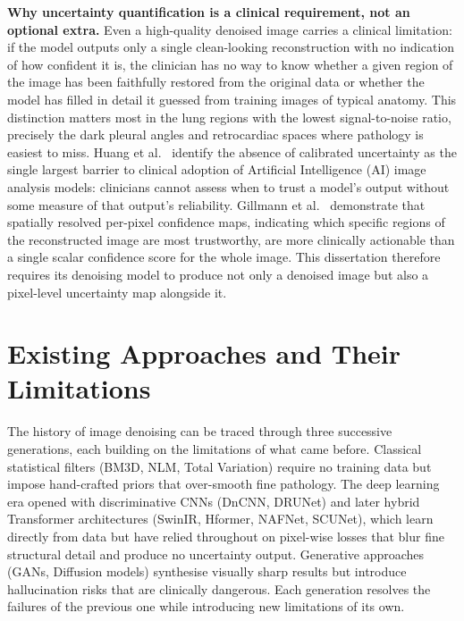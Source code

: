 \documentclass[12pt, a4paper, twoside, openright]{book}
\begin{document}
\textbf{Why uncertainty quantification is a clinical requirement, not an optional extra.} Even a high-quality denoised image carries a clinical limitation: if the model outputs only a single clean-looking reconstruction with no indication of how confident it is, the clinician has no way to know whether a given region of the image has been faithfully restored from the original data or whether the model has filled in detail it guessed from training images of typical anatomy. This distinction matters most in the lung regions with the lowest signal-to-noise ratio, precisely the dark pleural angles and retrocardiac spaces where pathology is easiest to miss. Huang et al.\ \cite{huang_review_2024} identify the absence of calibrated uncertainty as the single largest barrier to clinical adoption of Artificial Intelligence (AI) image analysis models: clinicians cannot assess when to trust a model's output without some measure of that output's reliability. Gillmann et al.\ \cite{gillmann_uncertainty_2021} demonstrate that spatially resolved per-pixel confidence maps, indicating which specific regions of the reconstructed image are most trustworthy, are more clinically actionable than a single scalar confidence score for the whole image. This dissertation therefore requires its denoising model to produce not only a denoised image but also a pixel-level uncertainty map alongside it.

\section{Existing Approaches and Their Limitations}
\label{sec:intro:existing}

The history of image denoising can be traced through three successive generations, each building on the limitations of what came before. Classical statistical filters (BM3D, NLM, Total Variation) require no training data but impose hand-crafted priors that over-smooth fine pathology. The deep learning era opened with discriminative CNNs (DnCNN, DRUNet) and later hybrid Transformer architectures (SwinIR, Hformer, NAFNet, SCUNet), which learn directly from data but have relied throughout on pixel-wise losses that blur fine structural detail and produce no uncertainty output. Generative approaches (GANs, Diffusion models) synthesise visually sharp results but introduce hallucination risks that are clinically dangerous. Each generation resolves the failures of the previous one while introducing new limitations of its own.
\end{document}
